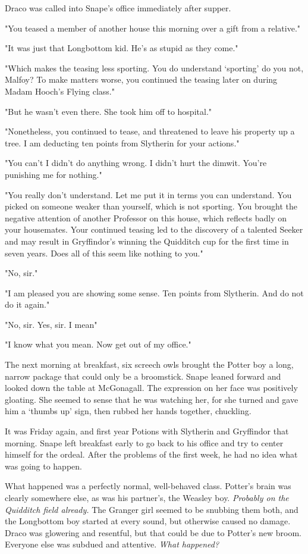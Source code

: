 Draco was called into Snape's office immediately after supper.

"You teased a member of another house this morning over a gift from a relative."

"It was just that Longbottom kid. He's as stupid as they come."

"Which makes the teasing less sporting. You do understand `sporting' do you not, Malfoy? To make matters worse, you continued the teasing later on during Madam Hooch's Flying class."

"But he wasn't even there. She took him off to hospital."

"Nonetheless, you continued to tease, and threatened to leave his property up a tree. I am deducting ten points from Slytherin for your actions."

"You can't{\el} I didn't do anything wrong. I didn't hurt the dimwit. You're punishing me for nothing."

"You really don't understand. Let me put it in terms you can understand. You picked on someone weaker than yourself, which is not sporting. You brought the negative attention of another Professor on this house, which reflects badly on your housemates. Your continued teasing led to the discovery of a talented Seeker and may result in Gryffindor's winning the Quidditch cup for the first time in seven years. Does all of this seem like nothing to you."

"No, sir."

"I am pleased you are showing some sense. Ten points from Slytherin. And do not do it again."

"No, sir. Yes, sir. I mean{\el}"

"I know what you mean. Now get out of my office."

The next morning at breakfast, six screech owls brought the Potter boy a long, narrow package that could only be a broomstick. Snape leaned forward and looked down the table at McGonagall. The expression on her face was positively gloating. She seemed to sense that he was watching her, for she turned and gave him a `thumbs up' sign, then rubbed her hands together, chuckling.

It was Friday again, and first year Potions with Slytherin and Gryffindor that morning. Snape left breakfast early to go back to his office and try to center himself for the ordeal. After the problems of the first week, he had no idea what was going to happen.

What happened was a perfectly normal, well-behaved class. Potter's brain was clearly somewhere else, as was his partner's, the Weasley boy. \emph{Probably on the Quidditch field already.} The Granger girl seemed to be snubbing them both, and the Longbottom boy started at every sound, but otherwise caused no damage. Draco was glowering and resentful, but that could be due to Potter's new broom. Everyone else was subdued and attentive. \emph{What happened?}

